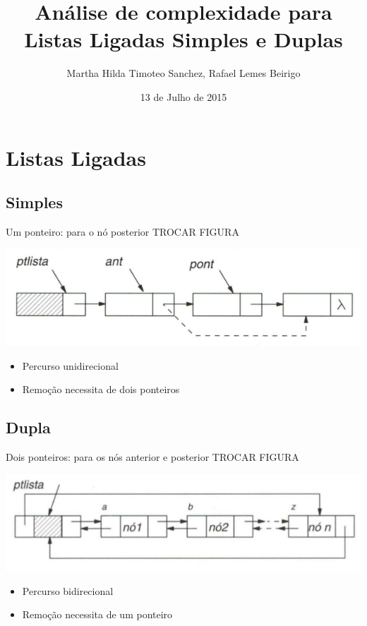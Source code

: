 \documentclass[bigger]{beamer}
\author{Martha Hilda Timoteo Sanchez, Rafael Lemes Beirigo}
\date{13 de Julho de 2015}
\title{Análise de complexidade para Listas Ligadas Simples e Duplas}
\begin{document}
\maketitle

\section{Listas Ligadas}
\label{sec-1}
\subsection{Simples}
\label{sec-1-1}
\begin{frame}[label=sec-1-1-1]{\alert{Um} ponteiro: para o nó posterior TROCAR FIGURA}
\begin{center}
\includegraphics[width=.9\linewidth]{fig/listasimple.png}
\end{center}
\begin{itemize}
\item Percurso unidirecional
\item Remoção necessita de dois ponteiros
\end{itemize}
\end{frame}
\subsection{Dupla}
\label{sec-1-2}
\begin{frame}[label=sec-1-2-1]{\alert{Dois} ponteiros: para os nós anterior e posterior TROCAR FIGURA}
\begin{center}
\includegraphics[width=.9\linewidth]{fig/listadoble.png}
\end{center}
\begin{itemize}
\item Percurso bidirecional
\item Remoção necessita de um ponteiro
\end{itemize}
\end{frame}
\end{document}
